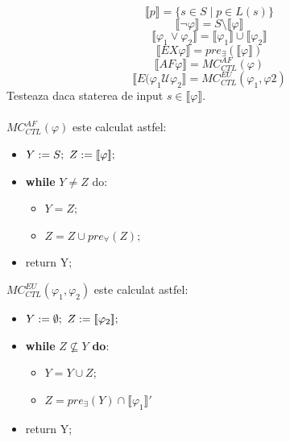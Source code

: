 \documentclass[10pt,a4paper,twocolumn]{report}
\begin{document}
\begin{itemize}
\[ \llbracket p \rrbracket = \{ s \in S \mid p \in L(s) \} \]
\[ \llbracket \neg \varphi \rrbracket = S \setminus \llbracket \varphi \rrbracket \]
\[ \llbracket \varphi_1 \vee \varphi_2 \rrbracket = \llbracket \varphi_1 \rrbracket \cup \llbracket \varphi_2 \rrbracket \]
\[ \llbracket EX\varphi \rrbracket = pre_\exists( \llbracket \varphi \rrbracket ) \]
\[ \llbracket AF\varphi \rrbracket = MC^{AF}_{CTL}(\varphi) \]
\[ \llbracket E(\varphi_1 \mathcal{U} \varphi_2 \rrbracket = MC^{EU}_{CTL}(\varphi_1, \varphi2) \]
Testeaza daca staterea de input $s \in \llbracket \varphi \rrbracket$.\\\\
$MC^{AF}_{CTL}(\varphi)$ este calculat astfel:
\begin{itemize}
\item $Y:=S; \textsl{ } Z:= \llbracket \varphi \rrbracket;$
\item \textbf{while} $Y \neq Z$ do:
	\begin{itemize}
	\item $Y = Z;$
	\item $Z = Z \cup pre_\forall(Z);$ 
	\end{itemize}
\item return Y;
\end{itemize}
$MC^{EU}_{CTL}(\varphi_1, \varphi_2)$ este calculat astfel: 
\begin{itemize}
\item $Y:=\emptyset; \textsl{ } Z:= \llbracket \varphi_2 \rrbracket;$
\item \textbf{while} $Z \not \subseteq Y$ \textbf{do}:
	\begin{itemize}
	\item $Y = Y \cup Z;$
	\item $Z = pre_\exists(Y) \cap \llbracket \varphi_1 \rrbracket'$
	\end{itemize}
\item return Y;
\end{itemize}
\end{itemize}
\end{document}

